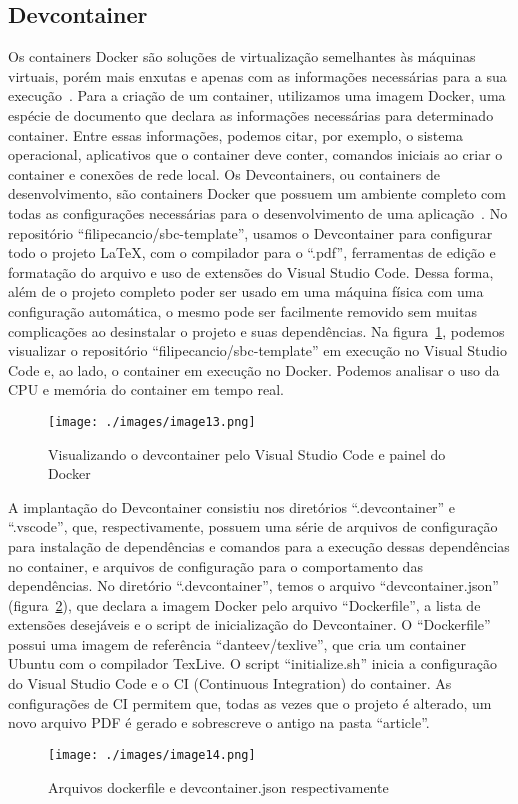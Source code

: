 

\subsection{Devcontainer}
Os containers Docker são soluções de virtualização semelhantes às máquinas virtuais, porém mais enxutas e apenas com as informações necessárias para a sua execução~\cite{vitalino:01}. Para a criação de um container, utilizamos uma imagem Docker, uma espécie de documento que declara as informações necessárias para determinado container. Entre essas informações, podemos citar, por exemplo, o sistema operacional, aplicativos que o container deve conter, comandos iniciais ao criar o container e conexões de rede local.
Os Devcontainers, ou containers de desenvolvimento, são containers Docker que possuem um ambiente completo com todas as configurações necessárias para o desenvolvimento de uma aplicação~\cite{github:01}. No repositório ``filipecancio/sbc-template'', usamos o Devcontainer para configurar todo o projeto LaTeX, com o compilador para o ``.pdf'', ferramentas de edição e formatação do arquivo e uso de extensões do Visual Studio Code. Dessa forma, além de o projeto completo poder ser usado em uma máquina física com uma configuração automática, o mesmo pode ser facilmente removido sem muitas complicações ao desinstalar o projeto e suas dependências.
Na figura~\ref{fig:image13}, podemos visualizar o repositório ``filipecancio/sbc-template'' em execução no Visual Studio Code e, ao lado, o container em execução no Docker. Podemos analisar o uso da CPU e memória do container em tempo real.

\begin{figure}[ht]
	\centering
	\texttt{[image: ./images/image13.png]}
	\caption{Visualizando o devcontainer pelo Visual Studio Code e painel do Docker}
	\label{fig:image13}
\end{figure}

A implantação do Devcontainer consistiu nos diretórios ``.devcontainer'' e ``.vscode'', que, respectivamente, possuem uma série de arquivos de configuração para instalação de dependências e comandos para a execução dessas dependências no container, e arquivos de configuração para o comportamento das dependências.
No diretório ``.devcontainer'', temos o arquivo ``devcontainer.json'' (figura~\ref{fig:image14}), que declara a imagem Docker pelo arquivo ``Dockerfile'', a lista de extensões desejáveis e o script de inicialização do Devcontainer. O ``Dockerfile'' possui uma imagem de referência ``danteev/texlive'', que cria um container Ubuntu com o compilador TexLive. O script ``initialize.sh'' inicia a configuração do Visual Studio Code e o CI (Continuous Integration) do container. As configurações de CI permitem que, todas as vezes que o projeto é alterado, um novo arquivo PDF é gerado e sobrescreve o antigo na pasta ``article''.

\begin{figure}[ht]
	\centering
	\texttt{[image: ./images/image14.png]}
	\caption{Arquivos dockerfile e devcontainer.json respectivamente}
	\label{fig:image14}
\end{figure}


